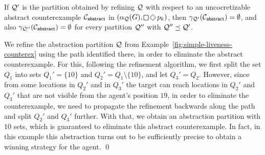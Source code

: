 \begin{theorem}If $\mathcal{Q}'$ is the partition 
obtained by refining $\mathcal{Q}$ with respect to an uncocretizable abstract counterexample $\mathcal{C}_{\mathsf{abstract}}$ in $(\alpha_\part(G),\LTLglobally\LTLfinally p_k)$, then $\gamma_{\mathcal{Q}'}(\mathcal{C}_{\mathsf{abstract}}) = \emptyset$, and also $\gamma_{\mathcal{Q}''}(\mathcal{C}_{\mathsf{abstract}}) = \emptyset$ for every partition $\mathcal{Q}''$ with $\mathcal{Q}'' \preceq \mathcal{Q}'$.
\end{theorem}

\begin{example}\label{ex:simple-liveness-refinement}
We refine the abstraction partition $\mathcal{Q}$ from Example~\ref{fig:simple-liveness-counterex} using the path identified there, in order to eliminate the abstract counterexample. For this, following the refinement algorithm, we first split the set $Q_1$ into sets $Q_1' = \{10\}$ and $Q_2' = Q_1 \setminus \{10\}$, and let $Q_3' = Q_2$. However, since from some locations in $Q_2'$ and in $Q_3'$ the target can reach locations in $Q_2'$ and $Q_3'$ that are not visible from the agent's position $19$, in order to eliminate the counterexample, we need to propagate the refinement backwards along the path and split $Q_2'$ and $Q_3'$ further. With that, we obtain an abstraction partition with $10$ sets, which is guaranteed to eliminate this abstract counterexample. In fact, in this example this abstraction turns out to be sufficiently precise to obtain a winning strategy for the agent.
\qed
\end{example}
